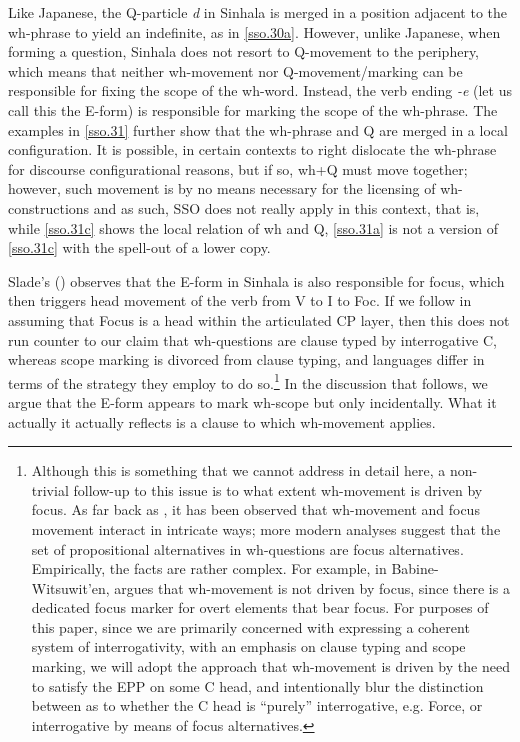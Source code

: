 \documentclass{glossa}
\begin{document}
Like Japanese, the Q-particle \textit{d\textschwa} in Sinhala is merged in a position adjacent to the wh-phrase to yield an indefinite, as in \ref{sso.30a}. However, unlike Japanese, when forming a question, Sinhala does not resort to Q-movement to the periphery, which means that neither wh-movement nor Q-movement/marking can be responsible for fixing the scope of the wh-word. Instead, the verb ending \textit{-e} (let us call this the E-form) is responsible for marking the scope of the wh-phrase. The examples in \ref{sso.31} further show that the wh-phrase and Q are merged in a local configuration. It is possible, in certain contexts to right dislocate the wh-phrase for discourse configurational reasons, but if so, wh+Q must move together; however, such movement is by no means necessary for the licensing of wh-constructions and as such, SSO does not really apply in this context, that is, while \ref{sso.31c} shows the local relation of wh and Q, \ref{sso.31a} is not a version of \ref{sso.31c} with the spell-out of a lower copy.

Slade's (\citeyear{slade:2011}) observes that the E-form in Sinhala is also responsible for focus, which then triggers head movement of the verb from V to I to Foc. If we follow \cite{rizzi:1997} in assuming that Focus is a head within the articulated CP layer, then this does not run counter to our claim that wh-questions are clause typed by interrogative C, whereas scope marking is divorced from clause typing, and languages differ in terms of the strategy they employ to do so.\footnote{Although this is something that we cannot address in detail here, a non-trivial follow-up to this issue is to what extent wh-movement is driven by focus. As far back as \cite{huang:1982}, it has been observed that wh-movement and focus movement interact in intricate ways; more modern analyses \citep{beck:2006} suggest that the set of propositional alternatives in wh-questions are focus alternatives. Empirically, the facts are rather complex. For example, in Babine-Witsuwit'en, \cite{denham:2000} argues that wh-movement is not driven by focus, since there is a dedicated focus marker for overt elements that bear focus. For purposes of this paper, since we are primarily concerned with expressing a coherent system of interrogativity, with an emphasis on clause typing and scope marking, we will adopt the approach that wh-movement is driven by the need to satisfy the EPP on some C head, and intentionally blur the distinction between as to whether the C head is ``purely'' interrogative, e.g. Force, or interrogative by means of focus alternatives.} In the discussion that follows, we argue that the E-form appears to mark wh-scope but only incidentally. What it actually it actually reflects is a clause to which wh-movement applies.
\end{document}
